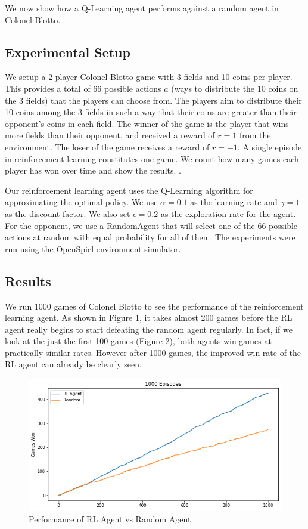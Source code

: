 \documentclass[11pt, oneside]{article}   	%
\begin{document}
We now show how a Q-Learning agent performs against a random agent in Colonel Blotto.

\subsection{Experimental Setup}

We setup a 2-player Colonel Blotto game with 3 fields and 10 coins per player. This provides a total of 66 possible actions $a$ (ways to distribute the 10 coins on the 3 fields) that the players can choose from. The players aim to distribute their 10 coins among the 3 fields in such a way that their coins are greater than their opponent's coins in each field. The winner of the game is the player that wins more fields than their opponent, and received a reward of $r=1$ from the environment. The loser of the game receives a reward of $r=-1$. A single episode in reinforcement learning constitutes one game. We count how many games each player has won over time and show the results. .

\hfill

Our reinforcement learning agent uses the Q-Learning algorithm for approximating the optimal policy. We use $\alpha=0.1$ as the learning rate and $\gamma=1$ as the discount factor. We also set $\epsilon=0.2$ as the exploration rate for the agent. For the opponent, we use a RandomAgent that will select one of the 66 possible actions at random with equal probability for all of them. The experiments were run using the OpenSpiel\cite{OpenSpiel} environment simulator.


\subsection{Results}

We run 1000 games of Colonel Blotto to see the performance of the reinforcement learning agent. As shown in Figure 1, it takes almost 200 games before the RL agent really begins to start defeating the random agent regularly. In fact, if we look at the just the first 100 games (Figure 2), both agents win games at practically similar rates. However after 1000 games, the improved win rate of the RL agent can already be clearly seen.

\begin{figure}[h]
    \centering
    \includegraphics[scale=0.5]{./images/rl_random.png}
    \caption{Performance of RL Agent vs Random Agent}
    \label{fig:mesh1}
\end{figure}
\end{document}
